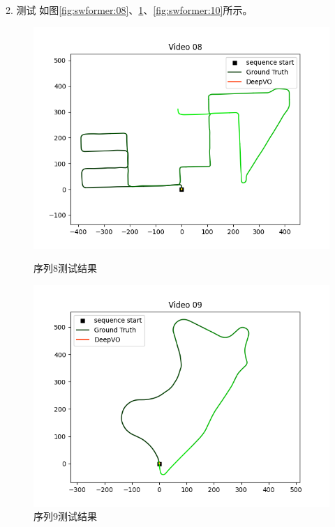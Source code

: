 2. 测试
如图\ref{fig:swformer:08}、\ref{fig:swformer:09}、\ref{fig:swformer:10}所示。

\begin{figure}[H]
	\centering
	
	\begin{minipage}{0.45\textwidth}
		\centering
		\includegraphics[width=\textwidth]{images/swformer/route_08_gradient.png}
		\caption{序列8测试结果}
		\label{fig:swformer:08}
	\end{minipage}
	\hfill
	\begin{minipage}{0.45\textwidth}
		\centering
		\includegraphics[width=\textwidth]{images/swformer/route_09_gradient.png}
		\caption{序列9测试结果}
		\label{fig:swformer:09}
	\end{minipage}
	

\end{figure}

